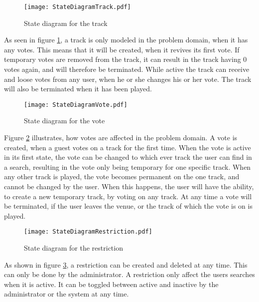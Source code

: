 \begin{figure}[H]
  \centering
  \texttt{[image: StateDiagramTrack.pdf]}
  \caption{State diagram for the track}\label{fig:StateDiagramTrack}
\end{figure}
As seen in figure \cref{fig:StateDiagramTrack}, a track is only modeled in the problem domain, when it has any votes. This means that it will be created, when it revives its first vote. If temporary votes are removed from the track, it can result in the track having 0 votes again, and will therefore be terminated. While active the track can receive and loose votes from any user, when he or she changes his or her vote. The track will also be terminated when it has been played.

\begin{figure}[H]
  \centering
  \texttt{[image: StateDiagramVote.pdf]}
  \caption{State diagram for the vote}\label{fig:StateDiagramVote}
\end{figure}
Figure \cref{fig:StateDiagramVote} illustrates, how votes are affected in the problem domain. A vote is created, when a guest votes on a track for the first time. When the vote is active in its first state, the vote can be changed to which ever track the user can find in a search, resulting in the vote only being temporary for one specific track. When any other track is played, the vote becomes permanent on the one track, and cannot be changed by the user. When this happens, the user will have the ability, to create a new temporary track, by voting on any track. At any time a vote will be terminated, if the user leaves the venue, or the track of which the vote is on is played.

\begin{figure}[H]
  \centering
  \texttt{[image: StateDiagramRestriction.pdf]}
  \caption{State diagram for the restriction}\label{fig:StateDiagramRestriction}
\end{figure}
As shown in figure \cref{fig:StateDiagramRestriction}, a restriction can be created and deleted at any time. This can only be done by the administrator. A restriction only affect the users searches when it is active. It can be toggled between active and inactive by the administrator or the system at any time.